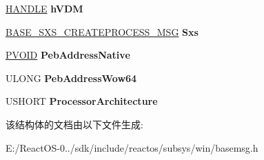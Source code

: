 \begin{DoxyCompactItemize}
\hyperlink{interfacevoid}{H\+A\+N\+D\+LE} {\bfseries h\+V\+DM}
\item 
\mbox{\label{struct___b_a_s_e___c_r_e_a_t_e___p_r_o_c_e_s_s_a13d960eefd84933ea4ddce5926f51c4b}} 
\hyperlink{struct___b_a_s_e___s_x_s___c_r_e_a_t_e_p_r_o_c_e_s_s___m_s_g}{B\+A\+S\+E\+\_\+\+S\+X\+S\+\_\+\+C\+R\+E\+A\+T\+E\+P\+R\+O\+C\+E\+S\+S\+\_\+\+M\+SG} {\bfseries Sxs}
\item 
\mbox{\label{struct___b_a_s_e___c_r_e_a_t_e___p_r_o_c_e_s_s_afc1a1d0425280253904015ad5602ffac}} 
\hyperlink{interfacevoid}{P\+V\+O\+ID} {\bfseries Peb\+Address\+Native}
\item 
\mbox{\label{struct___b_a_s_e___c_r_e_a_t_e___p_r_o_c_e_s_s_a63b48463ecee41f121b7e8f0119cbb59}} 
U\+L\+O\+NG {\bfseries Peb\+Address\+Wow64}
\item 
\mbox{\label{struct___b_a_s_e___c_r_e_a_t_e___p_r_o_c_e_s_s_a505e6b0ad6215a46f25e84244a16ba6a}} 
U\+S\+H\+O\+RT {\bfseries Processor\+Architecture}
\end{DoxyCompactItemize}


该结构体的文档由以下文件生成\+:\begin{DoxyCompactItemize}
\item 
E\+:/\+React\+O\+S-\/0../sdk/include/reactos/subsys/win/basemsg.\+h\end{DoxyCompactItemize}
